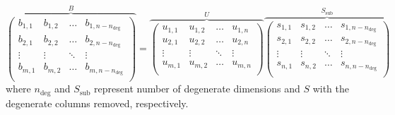 \begin{equation} \label{eq:svd-force}
	\overbrace{\left(
\begin{array}{cccc}
 b_{1,1} & b_{1,2} & \ldots  & b_{1,n-n_\text{deg}} \\
 b_{2,1} & b_{2,2} & \ldots  & b_{2,n-n_\text{deg}} \\
 \vdots  & \vdots  & \ddots & \vdots  \\
 b_{m,1} & b_{m,2} & \ldots  & b_{m,n-n_\text{deg}} \\
\end{array}
\right)}^B=\overbrace{\left(
\begin{array}{cccc}
 u_{1,1} & u_{1,2} & \ldots  & u_{1,n} \\
 u_{2,1} & u_{2,2} & \ldots  & u_{2,n} \\
 \vdots  & \vdots  & \ddots & \vdots  \\
 u_{m,1} & u_{m,2} & \ldots  & u_{m,n} \\
\end{array}
\right)}^U \overbrace{\left(
\begin{array}{cccc}
 s_{1,1} & s_{1,2} & \ldots  & s_{1,n-n_\text{deg}} \\
 s_{2,1} & s_{2,2} & \ldots  & s_{2,n-n_\text{deg}} \\
 \vdots  & \vdots  & \ddots & \vdots  \\
 s_{n,1} & s_{n,2} & \ldots  & s_{n,n-n_\text{deg}} \\
\end{array}
\right)}^{S_{\text{sub}}}
\end{equation}
where $n_\text{deg}$ and $S_{\text{sub}}$ represent number of degenerate dimensions and $S$ with the degenerate columns removed, respectively.